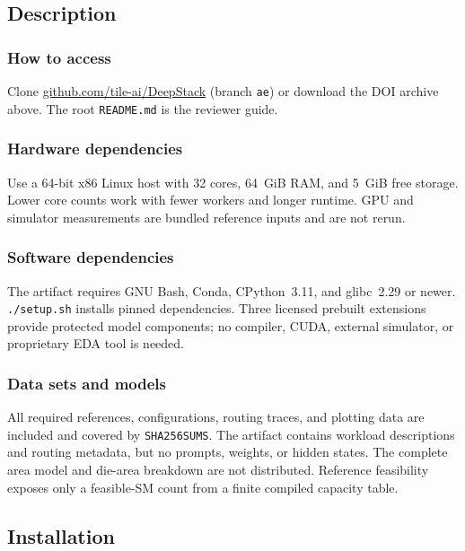 \documentclass[10pt,twocolumn]{article}
\newcommand{\code}[1]{\texttt{#1}}
\begin{document}
\subsection{Description}

\subsubsection{How to access}

Clone \href{https://github.com/tile-ai/DeepStack}{github.com/tile-ai/DeepStack}
(branch \code{ae}) or download the DOI archive above. The root
\code{README.md} is the reviewer guide.

\subsubsection{Hardware dependencies}

Use a 64-bit x86 Linux host with 32 cores, 64~GiB RAM, and 5~GiB free
storage. Lower core counts work with fewer workers and longer runtime. GPU and
simulator measurements are bundled reference inputs and are not rerun.

\subsubsection{Software dependencies}

The artifact requires GNU Bash, Conda, CPython~3.11, and glibc~2.29 or newer.
\code{./setup.sh} installs pinned dependencies. Three licensed prebuilt
extensions provide protected model components; no compiler, CUDA, external
simulator, or proprietary EDA tool is needed.

\subsubsection{Data sets and models}

All required references, configurations, routing traces, and plotting data are
included and covered by \code{SHA256SUMS}. The artifact contains workload
descriptions and routing metadata, but no prompts, weights, or hidden states.
The complete area model and die-area breakdown are not distributed. Reference
feasibility exposes only a feasible-SM count from a finite compiled capacity
table.

\subsection{Installation}
\end{document}
